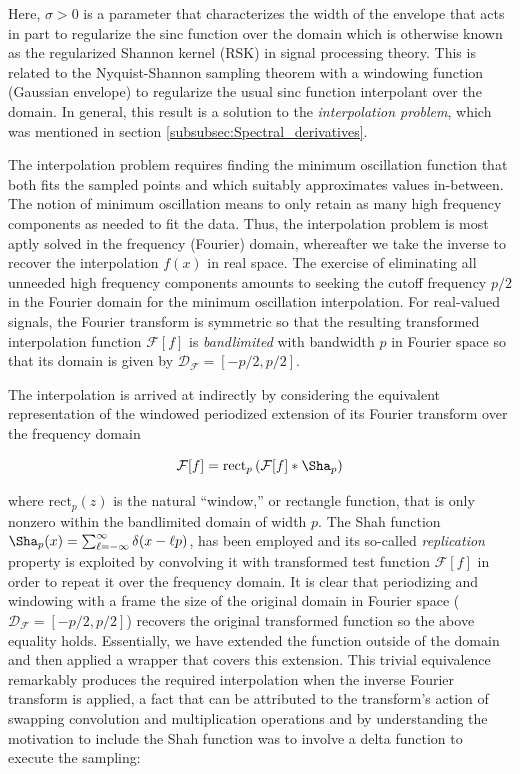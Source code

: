 \documentclass[11pt,titlepage]{report}
\begin{document}
\noindent Here, $\sigma > 0$ is a parameter that characterizes the width of the envelope that acts in part to regularize the sinc function over the domain which is otherwise known as the regularized Shannon kernel (RSK) in signal processing theory. This is related to the Nyquist-Shannon sampling theorem with a windowing function (Gaussian envelope) to regularize the usual sinc function interpolant over the domain. In general, this result is a solution to the \emph{interpolation problem}, which was mentioned in section \ref{subsubsec:Spectral_derivatives}. 

The interpolation problem requires finding the minimum oscillation function that both fits the sampled points and which suitably approximates values in-between. The notion of minimum oscillation means to only retain as many high frequency components as needed to fit the data. Thus, the interpolation problem is most aptly solved in the frequency (Fourier) domain, whereafter we take the inverse to recover the interpolation $f(x)$ in real space. The exercise of eliminating all unneeded high frequency components amounts to seeking the cutoff frequency $p/2$ in the Fourier domain for the minimum oscillation interpolation. For real-valued signals, the Fourier transform is symmetric so that the resulting transformed interpolation function $\mathcal{F}[f]$ is \emph{bandlimited} with bandwidth $p$ in Fourier space so that its domain is given by $\mathcal{D}_{\mathcal{F}} = [-p/2, p/2]$.

The interpolation is arrived at indirectly by considering the equivalent representation of the windowed periodized extension of its Fourier transform over the frequency domain 

$$\mathcal{F}[f] = \text{rect}_p\,(\mathcal{F}[f] * \Sha_p)$$

\noindent where $\text{rect}_p(z)$ is the natural ``window,'' or rectangle function, that is only nonzero within the bandlimited domain of width $p$. The Shah function $\Sha_p(x) = \sum_{\ell = -\infty}^{\infty} \delta (x - \ell p)$, has been employed and its so-called \emph{replication} property is exploited by convolving it with transformed test function $\mathcal{F}[f]$ in order to repeat it over the frequency domain. It is clear that periodizing and windowing with a frame the size of the original domain in Fourier space ($\mathcal{D}_{\mathcal{F}} = [-p/2, p/2]$) recovers the original transformed function so the above equality holds. Essentially, we have extended the function outside of the domain and then applied a wrapper that covers this extension. This trivial equivalence remarkably produces the required interpolation when the inverse Fourier transform is applied, a fact that can be attributed to the transform's action of swapping convolution and multiplication operations and by understanding the motivation to include the Shah function was to involve a delta function to execute the sampling:
\end{document}
